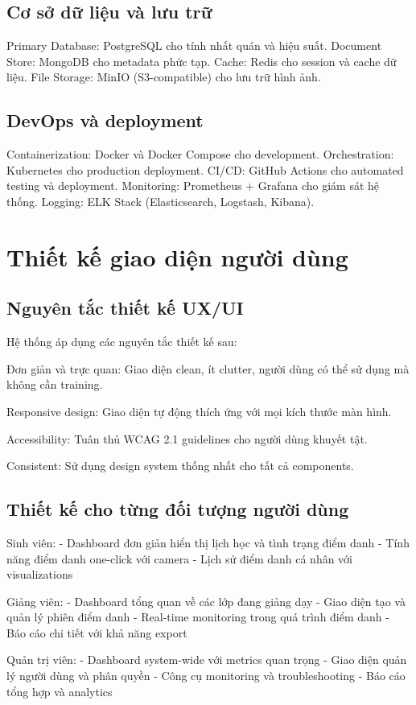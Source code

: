 \documentclass[12pt,a4paper]{report}
\begin{document}
\subsection{Cơ sở dữ liệu và lưu trữ}
Primary Database: PostgreSQL cho tính nhất quán và hiệu suất.
Document Store: MongoDB cho metadata phức tạp.
Cache: Redis cho session và cache dữ liệu.
File Storage: MinIO (S3-compatible) cho lưu trữ hình ảnh.

\subsection{DevOps và deployment}
Containerization: Docker và Docker Compose cho development.
Orchestration: Kubernetes cho production deployment.
CI/CD: GitHub Actions cho automated testing và deployment.
Monitoring: Prometheus + Grafana cho giám sát hệ thống.
Logging: ELK Stack (Elasticsearch, Logstash, Kibana).

\section{Thiết kế giao diện người dùng}
\subsection{Nguyên tắc thiết kế UX/UI}
Hệ thống áp dụng các nguyên tắc thiết kế sau:

Đơn giản và trực quan: Giao diện clean, ít clutter, người dùng có thể sử dụng mà không cần training.

Responsive design: Giao diện tự động thích ứng với mọi kích thước màn hình.

Accessibility: Tuân thủ WCAG 2.1 guidelines cho người dùng khuyết tật.

Consistent: Sử dụng design system thống nhất cho tất cả components.

\subsection{Thiết kế cho từng đối tượng người dùng}
Sinh viên: 
- Dashboard đơn giản hiển thị lịch học và tình trạng điểm danh
- Tính năng điểm danh one-click với camera
- Lịch sử điểm danh cá nhân với visualizations

Giảng viên:
- Dashboard tổng quan về các lớp đang giảng dạy
- Giao diện tạo và quản lý phiên điểm danh
- Real-time monitoring trong quá trình điểm danh
- Báo cáo chi tiết với khả năng export

Quản trị viên:
- Dashboard system-wide với metrics quan trọng
- Giao diện quản lý người dùng và phân quyền
- Công cụ monitoring và troubleshooting
- Báo cáo tổng hợp và analytics
\end{document}
